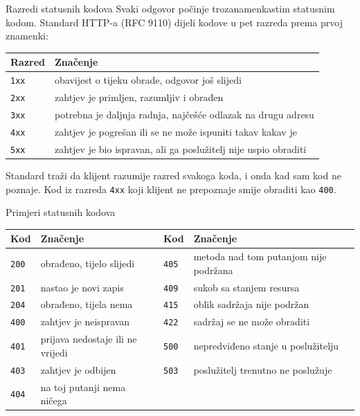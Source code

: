 \begin{frame}{Razredi statusnih kodova}
Svaki odgovor počinje trozanamenkastim statusnim kodom. Standard HTTP-a (RFC 9110) dijeli kodove u pet razreda prema prvoj znamenki:

\vspace{0.5em}
{\small
\setlength{\tabcolsep}{4pt}
\begin{tabular}{@{}lL{8.4cm}@{}}
  \toprule
  \textbf{Razred} & \textbf{Značenje} \\
  \midrule
  \texttt{1xx} & obavijest o tijeku obrade, odgovor još slijedi \\
  \texttt{2xx} & zahtjev je primljen, razumljiv i obrađen \\
  \texttt{3xx} & potrebna je daljnja radnja, najčešće odlazak na drugu adresu \\
  \texttt{4xx} & zahtjev je pogrešan ili se ne može ispuniti takav kakav je \\
  \texttt{5xx} & zahtjev je bio ispravan, ali ga poslužitelj nije uspio obraditi \\
  \bottomrule
\end{tabular}
}

\vspace{0.5em}
Standard traži da klijent razumije razred svakoga koda, i onda kad sam kod ne poznaje. Kod iz razreda \texttt{4xx} koji klijent ne prepoznaje smije obraditi kao \texttt{400}.
\end{frame}
\begin{frame}{Primjeri statusnih kodova}
\vspace{0.8em}
{\footnotesize
\setlength{\tabcolsep}{4pt}
\begin{tabular}{@{}lL{5.45cm}lL{5.45cm}@{}}
  \toprule
  \textbf{Kod} & \textbf{Značenje} & \textbf{Kod} & \textbf{Značenje} \\
  \midrule
  \texttt{200} & obrađeno, tijelo slijedi         & \texttt{405} & metoda nad tom putanjom nije podržana \\
  \texttt{201} & nastao je novi zapis             & \texttt{409} & sukob sa stanjem resursa \\
  \texttt{204} & obrađeno, tijela nema            & \texttt{415} & oblik sadržaja nije podržan \\
  \texttt{400} & zahtjev je neispravan            & \texttt{422} & sadržaj se ne može obraditi \\
  \texttt{401} & prijava nedostaje ili ne vrijedi & \texttt{500} & nepredviđeno stanje u poslužitelju \\
  \texttt{403} & zahtjev je odbijen               & \texttt{503} & poslužitelj trenutno ne poslužuje \\
  \texttt{404} & na toj putanji nema ničega       &              & \\
  \bottomrule
\end{tabular}
}

\end{frame}



